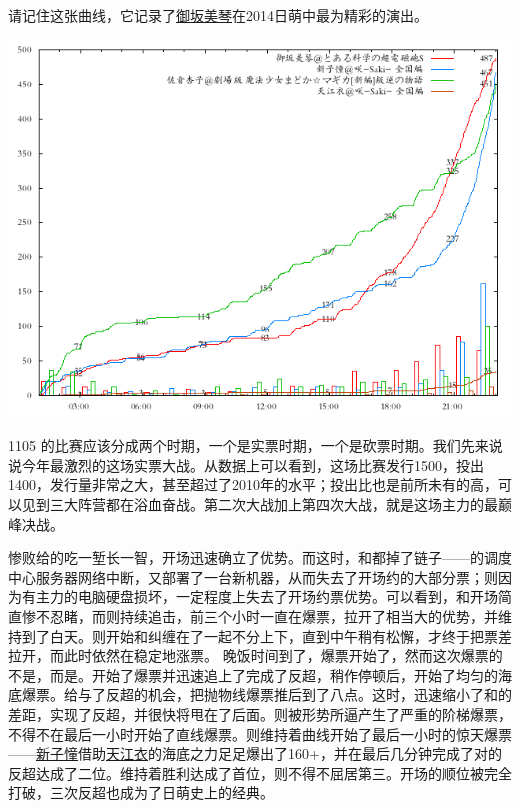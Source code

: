 请记住这张曲线，它记录了\uline{御坂美琴}在2014日萌中最为精彩的演出。

\includegraphics[width=.6\textwidth]{images/graph1105.png}


1105 的比赛应该分成两个时期，一个是实票时期，一个是砍票时期。我们先来说说今年最激烈的这场实票大战。从数据上可以看到，这场比赛发行1500，投出1400，发行量非常之大，甚至超过了2010年的水平；投出比也是前所未有的高，可以见到三大阵营都在浴血奋战。第二次大战加上第四次大战，就是这场主力的最巅峰决战。

惨败给的吃一堑长一智，开场迅速确立了优势。而这时，和都掉了链子——的调度中心服务器网络中断，又部署了一台新机器，从而失去了开场约的大部分票；则因为有主力的电脑硬盘损坏，一定程度上失去了开场约票优势。可以看到，和开场简直惨不忍睹，而则持续追击，前三个小时一直在爆票，拉开了相当大的优势，并维持到了白天。则开始和纠缠在了一起不分上下，直到中午稍有松懈，才终于把票差拉开，而此时依然在稳定地涨票。
晚饭时间到了，爆票开始了，然而这次爆票的不是，而是。开始了爆票并迅速追上了完成了反超，稍作停顿后，开始了均匀的海底爆票。给与了反超的机会，把抛物线爆票推后到了八点。这时，迅速缩小了和的差距，实现了反超，并很快将甩在了后面。则被形势所逼产生了严重的阶梯爆票，不得不在最后一小时开始了直线爆票。则维持着曲线开始了最后一小时的惊天爆票——\uline{新子憧}借助\uline{天江衣}的海底之力足足爆出了160+，并在最后几分钟完成了对的反超达成了二位。维持着胜利达成了首位，则不得不屈居第三。开场的顺位被完全打破，三次反超也成为了日萌史上的经典。

